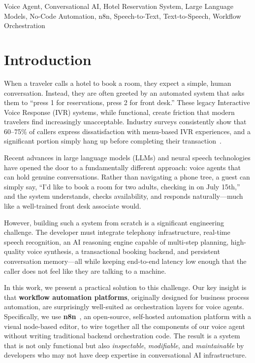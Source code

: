 \documentclass[conference]{IEEEtran}
\begin{document}
\begin{IEEEkeywords}
Voice Agent, Conversational AI, Hotel Reservation System, Large Language Models, No-Code Automation, n8n, Speech-to-Text, Text-to-Speech, Workflow Orchestration
\end{IEEEkeywords}

\section{Introduction}

When a traveler calls a hotel to book a room, they expect a simple, human conversation. Instead, they are often greeted by an automated system that asks them to ``press 1 for reservations, press 2 for front desk.'' These legacy Interactive Voice Response (IVR) systems, while functional, create friction that modern travelers find increasingly unacceptable. Industry surveys consistently show that 60--75\% of callers express dissatisfaction with menu-based IVR experiences, and a significant portion simply hang up before completing their transaction~\cite{kim2024voice, patel2023ivr}.

Recent advances in large language models (LLMs) and neural speech technologies have opened the door to a fundamentally different approach: voice agents that can hold genuine conversations. Rather than navigating a phone tree, a guest can simply say, ``I'd like to book a room for two adults, checking in on July 15th,'' and the system understands, checks availability, and responds naturally---much like a well-trained front desk associate would.

However, building such a system from scratch is a significant engineering challenge. The developer must integrate telephony infrastructure, real-time speech recognition, an AI reasoning engine capable of multi-step planning, high-quality voice synthesis, a transactional booking backend, and persistent conversation memory---all while keeping end-to-end latency low enough that the caller does not feel like they are talking to a machine.

In this work, we present a practical solution to this challenge. Our key insight is that \textbf{workflow automation platforms}, originally designed for business process automation, are surprisingly well-suited as orchestration layers for voice agents. Specifically, we use \textbf{n8n}~\cite{n8n2024}, an open-source, self-hosted automation platform with a visual node-based editor, to wire together all the components of our voice agent without writing traditional backend orchestration code. The result is a system that is not only functional but also \textit{inspectable}, \textit{modifiable}, and \textit{maintainable} by developers who may not have deep expertise in conversational AI infrastructure.
\end{document}
